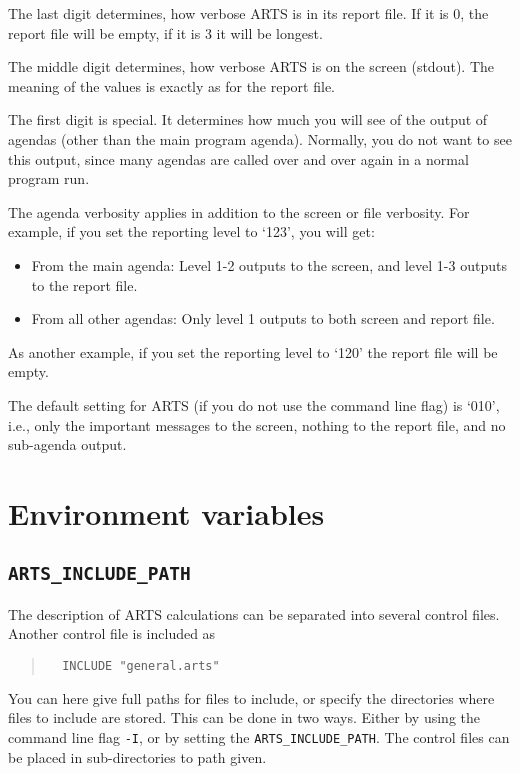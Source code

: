 The last digit determines, how verbose ARTS is in its report file. If
it is 0, the report file will be empty, if it is 3 it will be longest.

The middle digit determines, how verbose ARTS is on the screen
(stdout). The meaning of the values is exactly as for the report
file. 

The first digit is special. It determines how much you will see of the
output of agendas (other than the main program agenda). Normally, you
do not want to see this output, since many agendas are called over and
over again in a normal program run. 

The agenda verbosity applies in addition to the screen or file
verbosity. For example, if you set the reporting level to `123', you
will get: 
\begin{itemize}
\item From the main agenda: Level 1-2 outputs to the screen, and level
  1-3 outputs to the report file.
\item From all other agendas: Only level 1 outputs to both screen and
  report file.
\end{itemize}
As another example, if you set the reporting level to `120' the
report file will be empty.

The default setting for ARTS (if you do not use the command line flag)
is `010', i.e., only the important messages to the screen, nothing to
the report file, and no sub-agenda output.



\section{Environment variables}
\label{sec:concept:envvars}

\subsection*{\texttt{ARTS\_INCLUDE\_PATH}}

The description of ARTS calculations can be separated into several
control files. Another control file is included as
\begin{quote}
\begin{verbatim}
  INCLUDE "general.arts"
\end{verbatim}
\end{quote}
You can here give full paths for files to include, or specify the
directories where files to include are stored. This can be done in two
ways. Either by using the command line flag \verb|-I|, or by setting
the  \texttt{ARTS\_INCLUDE\_PATH}. The control
files can be placed in sub-directories to path given.




